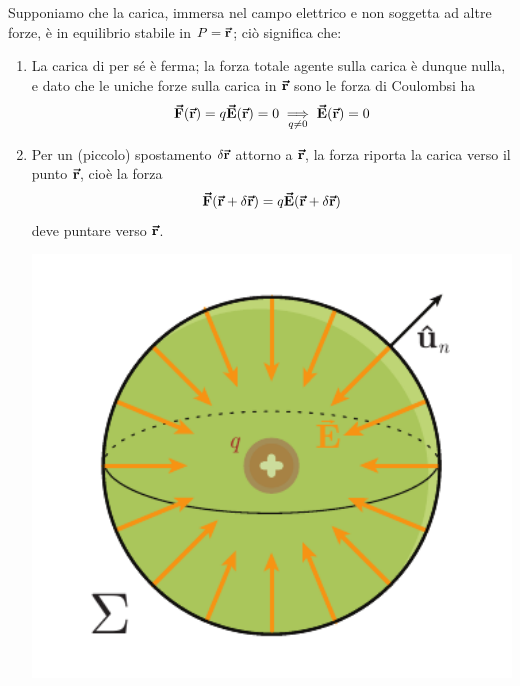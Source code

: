 \begin{demonstration}
	Supponiamo che la carica, immersa nel campo elettrico e non soggetta ad altre forze, è in equilibrio stabile in $P=\vb*{\va{r}}$; ciò significa che:
	\begin{enumerate}
		\item La carica di per sé è ferma; la forza totale agente sulla carica è dunque nulla, e dato che le uniche forze sulla carica in $\vb*{\va{r}}$ sono le forza di Coulombsi ha
		\begin{equation*}
			\vb*{\va{F}}(\vb*{\va{r}})=q\vb*{\va{E}}(\vb*{\va{r}})=0\underset{q\neq 0}{\implies}\vb*{\va{E}}(\vb*{\va{r}})=0
		\end{equation*}
		\item Per un (piccolo) spostamento $\delta \vb*{\va{r}}$ attorno a $\vb*{\va{r}}$, la forza riporta la carica verso il punto $\vb*{\va{r}}$, cioè la forza
		\begin{equation*}
			\vb*{\va{F}}(\vb*{\va{r}}+\delta\vb*{\va{r}})=q\vb*{\va{E}}(\vb*{\va{r}}+\delta\vb*{\va{r}})
		\end{equation*}
		deve puntare verso $\vb*{\va{r}}$.\\
		\begin{minipage}{0.35\textwidth}
			\begin{center}
				\includegraphics[width=1\textwidth]{images/chp2earnshaw.pdf}
			\end{center}
		\end{minipage}\hspace{5pt}
		\begin{minipage}{0.54\textwidth}

\end{minipage}
\end{enumerate}
\end{demonstration}
